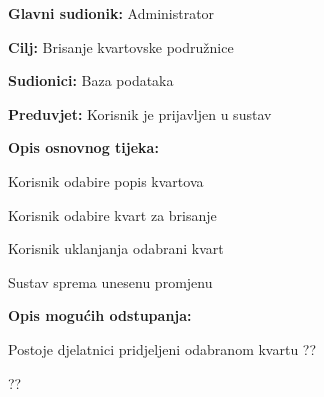 				
				
				\noindent {}
					\begin{packed_item}
	
						\item \textbf{Glavni sudionik: }Administrator
						\item  \textbf{Cilj:} Brisanje kvartovske podružnice
						\item  \textbf{Sudionici:} Baza podataka
						\item  \textbf{Preduvjet:} Korisnik je prijavljen u sustav
						\item  \textbf{Opis osnovnog tijeka:}
						
						\item[] \begin{packed_enum}
	
							\item Korisnik odabire popis kvartova
							\item Korisnik odabire kvart za brisanje 
							\item Korisnik uklanjanja odabrani kvart
							\item Sustav sprema unesenu promjenu						
							
							\end{packed_enum}
						
						\item  \textbf{Opis mogućih odstupanja:}
						
						\item[] \begin{packed_item}
	
							\item[3.a] Postoje djelatnici pridjeljeni odabranom kvartu ??
							
							\item[] \begin{packed_enum}
								
								\item ??
								
							\end{packed_enum}
						\end{packed_item}
					\end{packed_item}
				
